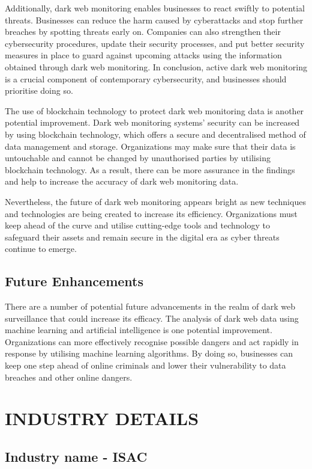 \documentclass[10pt]{report}
\begin{document}
Additionally, dark web monitoring enables businesses to react swiftly to potential threats. Businesses can reduce the harm caused by cyberattacks and stop further breaches by spotting threats early on. Companies can also strengthen their cybersecurity procedures, update their security processes, and put better security measures in place to guard against upcoming attacks using the information obtained through dark web monitoring. In conclusion, active dark web monitoring is a crucial component of contemporary cybersecurity, and businesses should prioritise doing so.

The use of blockchain technology to protect dark web monitoring data is another potential improvement. Dark web monitoring systems' security can be increased by using blockchain technology, which offers a secure and decentralised method of data management and storage. Organizations may make sure that their data is untouchable and cannot be changed by unauthorised parties by utilising blockchain technology. As a result, there can be more assurance in the findings and help to increase the accuracy of dark web monitoring data.

Nevertheless, the future of dark web monitoring appears bright as new techniques and technologies are being created to increase its efficiency. Organizations must keep ahead of the curve and utilise cutting-edge tools and technology to safeguard their assets and remain secure in the digital era as cyber threats continue to emerge.
\section{Future Enhancements}
There are a number of potential future advancements in the realm of dark web surveillance that could increase its efficacy. The analysis of dark web data using machine learning and artificial intelligence is one potential improvement. Organizations can more effectively recognise possible dangers and act rapidly in response by utilising machine learning algorithms. By doing so, businesses can keep one step ahead of online criminals and lower their vulnerability to data breaches and other online dangers.


\chapter{INDUSTRY DETAILS}
\section{Industry name - ISAC}
\end{document}

